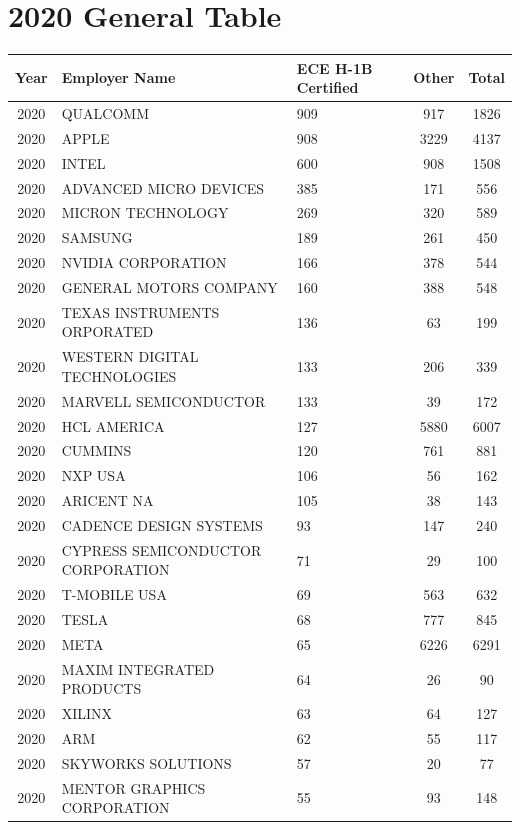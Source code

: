 \documentclass{article}%
\begin{document}
%
\normalsize%
\section{2020 General Table}%
\label{sec:2020GeneralTable}%
\begin{longtable}{c|p{20em}|p{5em}|c|c}%
\hline%
Year&Employer Name&ECE \newline%
 H{-}1B \newline%
 Certified&Other&Total\\%
\hline%
2020&QUALCOMM&909&917&1826\\%
\hline%
2020&APPLE&908&3229&4137\\%
\hline%
2020&INTEL&600&908&1508\\%
\hline%
2020&ADVANCED MICRO DEVICES&385&171&556\\%
\hline%
2020&MICRON TECHNOLOGY&269&320&589\\%
\hline%
2020&SAMSUNG&189&261&450\\%
\hline%
2020&NVIDIA CORPORATION&166&378&544\\%
\hline%
2020&GENERAL MOTORS COMPANY&160&388&548\\%
\hline%
2020&TEXAS INSTRUMENTS ORPORATED&136&63&199\\%
\hline%
2020&WESTERN DIGITAL TECHNOLOGIES&133&206&339\\%
\hline%
2020&MARVELL SEMICONDUCTOR&133&39&172\\%
\hline%
2020&HCL AMERICA&127&5880&6007\\%
\hline%
2020&CUMMINS&120&761&881\\%
\hline%
2020&NXP USA&106&56&162\\%
\hline%
2020&ARICENT NA&105&38&143\\%
\hline%
2020&CADENCE DESIGN SYSTEMS&93&147&240\\%
\hline%
2020&CYPRESS SEMICONDUCTOR CORPORATION&71&29&100\\%
\hline%
2020&T{-}MOBILE USA&69&563&632\\%
\hline%
2020&TESLA&68&777&845\\%
\hline%
2020&META&65&6226&6291\\%
\hline%
2020&MAXIM INTEGRATED PRODUCTS&64&26&90\\%
\hline%
2020&XILINX&63&64&127\\%
\hline%
2020&ARM&62&55&117\\%
\hline%
2020&SKYWORKS SOLUTIONS&57&20&77\\%
\hline%
2020&MENTOR GRAPHICS CORPORATION&55&93&148\\%

\end{longtable}
\end{document}
